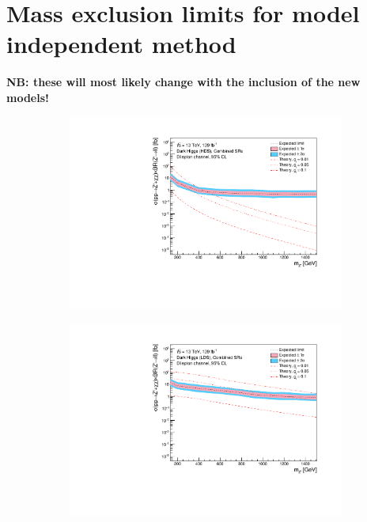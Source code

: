 \documentclass[12pt, a4paper]{book}
\begin{document}
\clearpage
\section{Mass exclusion limits for model independent method}\label{fig:model_indep_exclusions}
\textbf{NB: these will most likely change with the inclusion of the new models!}
\begin{figure}[!ht]
	\centering
	\begin{subfigure}[b]{0.49\textwidth}
      \centering
      \includegraphics[width=1\textwidth]{Limits/Model_independent/DH_HDS/mass_exclusion_comb.pdf}
   \end{subfigure}
   \hfill
   \begin{subfigure}[b]{0.49\textwidth}
      \centering
      \includegraphics[width=1\textwidth]{Limits/Model_independent/DH_LDS/mass_exclusion_comb.pdf}

\end{subfigure}
\end{figure}
\end{document}
